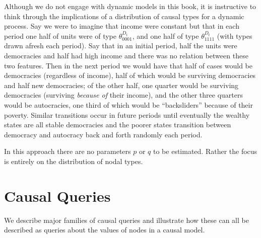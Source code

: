 \documentclass[
  12pt,
]{book}
\newenvironment{headerbox}{
  \definecolor{shadecolor}{rgb}{0.8, 0.8, 0.8}  %
  \color{black}
  \begin{shaded}}{\end{shaded}}
\begin{document}
Although we do not engage with dynamic models in this book, it is instructive to think through the implications of a distribution of causal types for a dynamic process. Say we were to imagine that income were constant but that in each period one half of units were of type \(\theta^{D_t}_{0001}\), and one half of type \(\theta^{D_t}_{1111}\) (with types drawn afresh each period). Say that in an initial period, half the units were democracies and half had high income and there was no relation between these two features. Then in the next period we would have that
half of cases would be democracies (regardless of income), half of which would be surviving democracies and half new democracies; of the other half, one quarter would be surviving democracies (surviving \emph{because of} their income), and the other three quarters would be autocracies, one third of which would be ``backsliders'' because of their poverty. Similar transitions occur in future periods until eventually the wealthy states are all stable democracies and the poorer states transition between democracy and autocracy back and forth randomly each period.

In this approach there are no parameters \(p\) or \(q\) to be estimated. Rather the focus is entirely on the distribution of nodal types.

\hypertarget{questions}{%
\chapter{Causal Queries}\label{questions}}

\begin{headerbox}
We describe major families of causal queries and illustrate how these can all be described as queries about the values of nodes in a causal model.

\end{headerbox}
\end{document}
